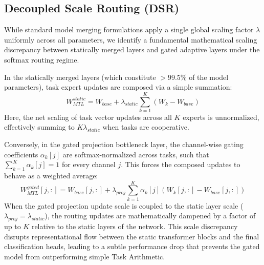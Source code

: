 \subsection{Decoupled Scale Routing (DSR)}
\label{subsec:dsr}
While standard model merging formulations apply a single global scaling factor $\lambda$ uniformly across all parameters, we identify a fundamental mathematical scaling discrepancy between statically merged layers and gated adaptive layers under the softmax routing regime.

In the statically merged layers (which constitute $>99.5\%$ of the model parameters), task expert updates are composed via a simple summation:
\begin{equation}
W_{MTL}^{static} = W_{base} + \lambda_{static} \sum_{k=1}^K \left(W_k - W_{base}\right)
\end{equation}
Here, the net scaling of task vector updates across all $K$ experts is unnormalized, effectively summing to $K \lambda_{static}$ when tasks are cooperative.

Conversely, in the gated projection bottleneck layer, the channel-wise gating coefficients $\alpha_k[j]$ are softmax-normalized across tasks, such that $\sum_{k=1}^K \alpha_k[j] = 1$ for every channel $j$. This forces the composed updates to behave as a weighted average:
\begin{equation}
W_{MTL}^{gated}[j, :] = W_{base}[j, :] + \lambda_{proj} \sum_{k=1}^K \alpha_k[j] \left(W_k[j, :] - W_{base}[j, :]\right)
\end{equation}
When the gated projection update scale is coupled to the static layer scale ($\lambda_{proj} = \lambda_{static}$), the routing updates are mathematically dampened by a factor of up to $K$ relative to the static layers of the network. This scale discrepancy disrupts representational flow between the static transformer blocks and the final classification heads, leading to a subtle performance drop that prevents the gated model from outperforming simple Task Arithmetic.

